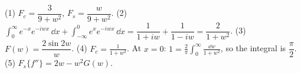 \begin{answerbox}
(1) $F_c = \dfrac{3}{9+w^2}$, $F_s = \dfrac{w}{9+w^2}$. \quad (2) $\displaystyle\int_0^\infty e^{-x}e^{-iwx}\,\dd x + \int_{-\infty}^0 e^{x}e^{-iwx}\,\dd x = \dfrac1{1+iw} + \dfrac1{1-iw} = \dfrac{2}{1+w^2}$. \quad (3) $F(w) = \dfrac{2\sin 2w}{w}$. \quad (4) $F_c = \frac1{1+w^2}$. At $x=0$: $1 = \frac2\pi\int_0^\infty\frac{\dd w}{1+w^2}$, so the integral is $\dfrac\pi2$. \quad (5) $F_s\{f''\} = 2w - w^2G(w)$.
\end{answerbox}

